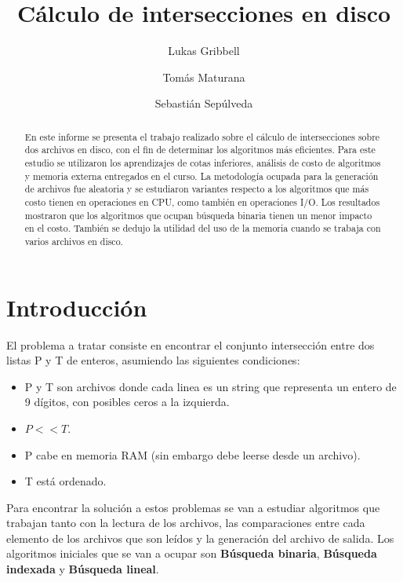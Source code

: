\documentclass[11pt]{article}
\title{Cálculo de intersecciones en disco}
\author{Lukas Gribbell \and Tomás Maturana \and Sebastián Sepúlveda}
\begin{document}
\maketitle

\begin{abstract}
	En este informe se presenta el trabajo realizado sobre el cálculo de intersecciones sobre dos archivos en disco, con el fin de determinar los algoritmos más eficientes. Para este estudio se utilizaron los aprendizajes de cotas inferiores, análisis de costo de algoritmos y memoria externa entregados en el curso. La metodología ocupada para la generación de archivos fue aleatoria y se estudiaron variantes respecto a los algoritmos que más costo tienen en operaciones en CPU, como también en operaciones I/O. Los resultados mostraron que los algoritmos que ocupan búsqueda binaria tienen un menor impacto en el costo. También se dedujo la utilidad del uso de la memoria cuando se trabaja con varios archivos en disco.
\end{abstract}

\section{Introducción}


El problema a tratar consiste en encontrar el conjunto intersección entre dos listas P y T de enteros, asumiendo las siguientes condiciones:

\begin{itemize}
    \item P y T son archivos donde cada linea es un string que representa un entero de 9 dígitos, con posibles ceros a la izquierda.
    \item $P << T$.
    \item P cabe en memoria RAM (sin embargo debe leerse desde un archivo).
    \item T está ordenado.
\end{itemize}

Para encontrar la solución a estos problemas se van a estudiar algoritmos que trabajan tanto con la lectura de los archivos, las comparaciones entre cada elemento de los archivos que son leídos y la generación del archivo de salida. Los algoritmos iniciales que se van a ocupar son \textbf{Búsqueda binaria}, \textbf{Búsqueda indexada} y \textbf{Búsqueda lineal}. 
\end{document}
